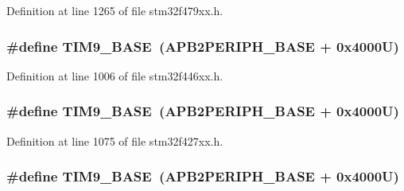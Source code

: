 Definition at line 1265 of file stm32f479xx.\+h.

\subsubsection[{\texorpdfstring{T\+I\+M9\+\_\+\+B\+A\+SE}{TIM9_BASE}}]{\setlength{\rightskip}{0pt plus 5cm}\#define T\+I\+M9\+\_\+\+B\+A\+SE~({\bf A\+P\+B2\+P\+E\+R\+I\+P\+H\+\_\+\+B\+A\+SE} + 0x4000\+U)}\hypertarget{group___peripheral__memory__map_ga92ae902be7902560939223dd765ece08}{}\label{group___peripheral__memory__map_ga92ae902be7902560939223dd765ece08}


Definition at line 1006 of file stm32f446xx.\+h.

\subsubsection[{\texorpdfstring{T\+I\+M9\+\_\+\+B\+A\+SE}{TIM9_BASE}}]{\setlength{\rightskip}{0pt plus 5cm}\#define T\+I\+M9\+\_\+\+B\+A\+SE~({\bf A\+P\+B2\+P\+E\+R\+I\+P\+H\+\_\+\+B\+A\+SE} + 0x4000\+U)}\hypertarget{group___peripheral__memory__map_ga92ae902be7902560939223dd765ece08}{}\label{group___peripheral__memory__map_ga92ae902be7902560939223dd765ece08}


Definition at line 1075 of file stm32f427xx.\+h.

\subsubsection[{\texorpdfstring{T\+I\+M9\+\_\+\+B\+A\+SE}{TIM9_BASE}}]{\setlength{\rightskip}{0pt plus 5cm}\#define T\+I\+M9\+\_\+\+B\+A\+SE~({\bf A\+P\+B2\+P\+E\+R\+I\+P\+H\+\_\+\+B\+A\+SE} + 0x4000\+U)}\hypertarget{group___peripheral__memory__map_ga92ae902be7902560939223dd765ece08}{}\label{group___peripheral__memory__map_ga92ae902be7902560939223dd765ece08}


